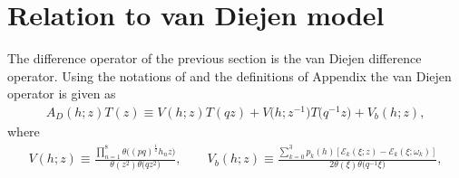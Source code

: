 \documentclass[a4paper,12pt]{article}
\begin{document}
\section{Relation to van Diejen model}
The difference operator of the previous section is the van Diejen difference operator. Using the notations of  and the definitions of Appendix the van Diejen operator is given as
\begin{gather*}
A_D(h;z)T(z)\equiv V(h;z)T(qz)+V\big(h;z^{-1}\big)T\big(q^{-1}z\big)+V_b(h;z) ,
\end{gather*}
where
\begin{gather*}
 V(h;z) \equiv \frac{\prod\limits_{n=1}^8\theta\big((pq)^{\frac12}h_n z\big)}{\theta(z^2)\theta\big(qz^2\big)},\qquad
 V_b(h;z) \equiv \frac{\sum\limits_{k=0}^3p_k(h)[\mathcal{E}_k(\xi;z)-\mathcal{E}_k(\xi;\omega_k)]}{2\theta(\xi)\theta\big(q^{-1}\xi\big)} ,
\end{gather*}
\end{document}

